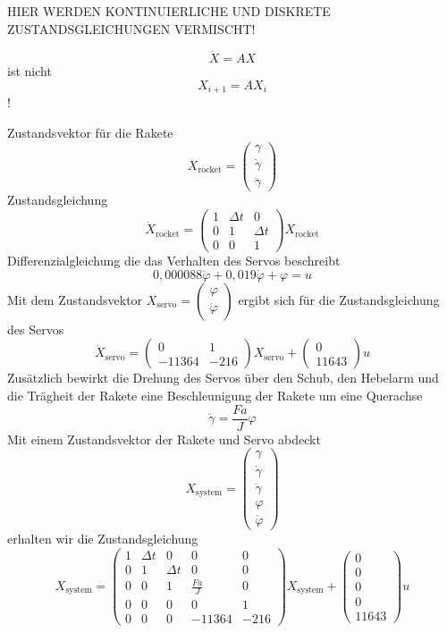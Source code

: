 \documentclass[a4paper]{article}
\begin{document}
\Large{HIER WERDEN KONTINUIERLICHE UND DISKRETE ZUSTANDSGLEICHUNGEN VERMISCHT!}

\[ \dot{X} = AX \]
ist nicht
\[ X_{i+1} = AX_i \]!

Zustandsvektor für die Rakete
\[ X_{\textrm{rocket}} = \begin{pmatrix}\gamma \\ \dot{\gamma} \\ \ddot{\gamma} \end{pmatrix} \]
Zustandsgleichung
\[ \dot{X}_{\textrm{rocket}} = \begin{pmatrix} 
1 & \Delta t & 0 \\ 
0 & 1 & \Delta t \\ 
0 & 0 & 1 
\end{pmatrix} X_{\textrm{rocket}} \]
Differenzialgleichung die das Verhalten des Servos beschreibt
\[ 0,000088 \ddot{\varphi} + 0,019 \dot{\varphi} + \varphi = u \]
Mit dem Zustandsvektor $X_{\textrm{servo}} = \begin{pmatrix} \varphi \\ \dot{\varphi} \end{pmatrix}$ ergibt sich für die Zustandsgleichung des Servos
\[ \dot{X}_{\textrm{servo}} = \begin{pmatrix} 0 & 1 \\ -11364 & -216 \end{pmatrix} X_{\textrm{servo}} + \begin{pmatrix} 0 \\ 11643 \end{pmatrix} u \]
Zusätzlich bewirkt die Drehung des Servos über den Schub, den Hebelarm und die Trägheit der Rakete eine Beschleunigung der Rakete um eine Querachse
\[ \ddot{\gamma} = \frac{F a}{J} \varphi \]
Mit einem Zustandsvektor der Rakete und Servo abdeckt
\[ X_{\textrm{system}} = \begin{pmatrix} \gamma \\ \dot{\gamma} \\ \ddot{\gamma} \\ \varphi \\ \dot{\varphi} \end{pmatrix} \]
erhalten wir die Zustandsgleichung
\[ X_{\textrm{system}} = \begin{pmatrix} 1 & \Delta t & 0 & 0 & 0 \\
0 & 1 & \Delta t & 0 & 0 \\
0 & 0 & 1 & \frac{F a}{J} & 0 \\
0 & 0 & 0 & 0 & 1 \\
0 & 0 & 0 & -11364 & -216 \end{pmatrix} X_{\textrm{system}} +\begin{pmatrix} 0 \\ 0 \\ 0 \\ 0 \\ 11643 \end{pmatrix} u \]
\end{document}
